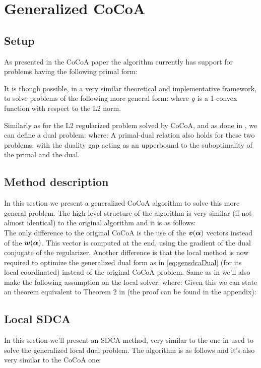 \section{Generalized CoCoA}

\subsection{Setup}
As presented in the CoCoA paper \cite{CoCoA} the algorithm currently has support for problems having the following
primal form:
\sdcaPrimal

It is though possible, in a very similar theoretical and implementative framework, to solve problems of the following
more general form:
\gensdcaPrimal
where $\emph{g}$ is a 1-convex function with respect to the L2 norm.

Similarly as for the L2 regularized problem solved by CoCoA, and as done in \cite{ShalevShwartz:2012tn}, we can define
a dual problem:
\gensdcaDual
where:
\vwdef
A primal-dual relation also holds for these two problems, with the duality gap \dualitygap acting as an upperbound
to the suboptimality of the primal and the dual.

\subsection{Method description}
In this section we present a generalized CoCoA algorithm to solve this more general problem. The high level structure of
the algorithm is very similar (if not almost identical) to the original algorithm and it is as follows: \\
\gencocoa
The only difference to the original CoCoA is the use of the $\bm{v}(\bm{\alpha})$ vectors instead of the ${\bm{w}}(\bm{\alpha})$. This vector
is computed at the end, using the gradient of the dual conjugate of the regularizer. Another difference is that the
local method is now required to optimize the generalized dual form as in \ref{eq:gensdcaDual} (for its local coordinated)
instead of the original CoCoA problem.
Same as in \cite{CoCoA} we'll also make the following assumption on the local solver:
\localgeomimpr
where:
\suboptimality
Given this we can state an theorem equivalent to Theorem 2 in \cite{CoCoA} (the proof can be found in the appendix):
\convergence

\subsection{Local SDCA}
In this section we'll present an SDCA method, very similar to the one in \cite{ShalevShwartz:2012tn} used to solve the
generalized local dual problem. The algorithm is as follows and it's also very similar to the CoCoA one: \\
\genlocalsdca

